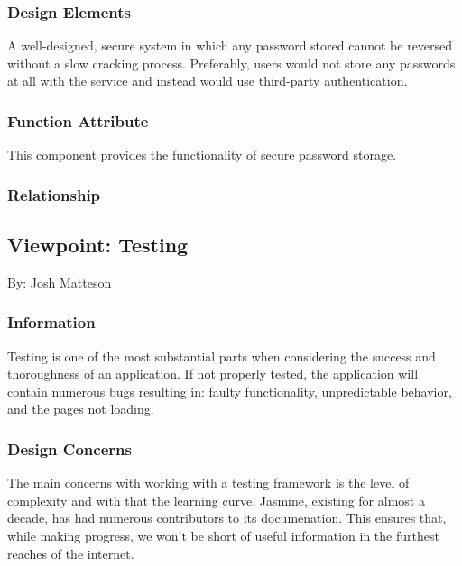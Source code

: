 \documentclass[letterpaper, 10pt, draftclsnofoot, compsoc, onecolumn]{IEEEtran}
\begin{document}
\subsubsection{Design Elements}
A well-designed, secure system in which any password stored cannot be reversed
without a slow cracking process. Preferably, users would not store any passwords
at all with the service and instead would use third-party authentication.
{\noindent  \par}

\subsubsection{Function Attribute}
This component provides the functionality of secure password storage.
{\noindent  \par}

\subsubsection{Relationship}






\newpage
\subsection{Viewpoint: Testing}
{\noindent By: Josh Matteson \par}

\subsubsection{Information}
{\noindent Testing is one of the most substantial parts when considering the success and thoroughness of an application. 
If not properly tested, the application will contain numerous bugs resulting in: faulty functionality, unpredictable behavior, and the pages not loading. \par}

\subsubsection{Design Concerns}
{\noindent The main concerns with working with a testing framework is the level of complexity and with that the learning curve. 
Jasmine, existing for almost a decade, has had numerous contributors to its documenation. This ensures that, while making progress, 
we won't be short of useful information in the furthest reaches of the internet. \par}
\end{document}
